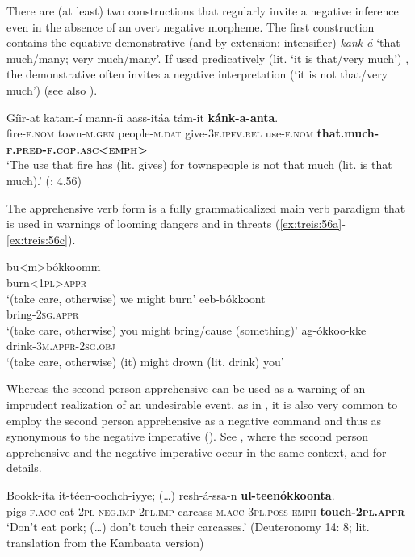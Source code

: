 \documentclass[output=paper,colorlinks,citecolor=brown,draftmode
]{langscibook}
\begin{document}
There are (at least) two constructions that regularly invite a negative inference even in the absence of an overt negative morpheme. The first construction contains the equative demonstrative (and by extension: intensifier) \textit{kank-á} ‘that much/\hspace{0pt}many; very much/many’. If used predicatively (lit. ‘it is that/very much’) , the demonstrative often invites a negative interpretation (‘it is not that/very much’) (see also \citealt[195]{Treis2019}).

\ea\label{ex:treis:55} 
\gll Gíir-at		katam-í			mann-íi			aass-itáa			tám-it	\textbf{kánk-a-anta}.\\
fire-\textsc{f.nom}	town-\textsc{m.gen}	people-\textsc{m.dat}	give-\textsc{3f.ipfv.rel}	use-\textsc{f.nom} \textbf{that.much-\textsc{f.pred-f.cop.asc<emph>}}\\
\glt ‘The use that fire has (lit. gives) for townspeople is not that much (lit. is that much).’ (\cite{KEB1989}{:} 4.56)
\z 

The apprehensive verb form \citep{TreisForthcoming} is a fully grammaticalized main verb paradigm that is used in warnings of looming dangers and in threats (\ref{ex:treis:56a}-\ref{ex:treis:56c}). 

\ea
\ea\label{ex:treis:56a}
\gll bu<m>bókkoomm \\
burn<\textsc{1pl>appr}\\
\glt ‘(take care, otherwise) we might burn’
\ex\label{ex:treis:56b}
\gll eeb-bókkoont \\
bring-\textsc{2sg.appr}\\
\glt ‘(take care, otherwise) you might bring/cause (something)’
\ex\label{ex:treis:56c}
\gll ag-ókkoo-kke\\
drink-\textsc{3m.appr-2sg.obj}\\
\glt ‘(take care, otherwise) (it) might drown (lit. drink) you’
\z
\z

Whereas the second person apprehensive can be used as a warning of an imprudent realization of an undesirable event, as in , it is also very common to employ the second person apprehensive as a negative command and thus as synonymous to the negative imperative (). See , where the second person apprehensive and the negative imperative occur in the same context, and \citet[§3.3]{TreisForthcoming} for details.

\ea\label{ex:treis:57}  
\gll Bookk-íta 	it-téen-oochch-iyye; (…) 	resh-á-ssa-n	\textbf{ul-teenókkoonta}.\\
pigs-\textsc{f.acc}	eat-\textsc{2pl-neg.imp-2pl.imp}	{} carcass-\textsc{m.acc-3pl.poss-emph} \textbf{touch-\textsc{2pl.appr}}\\
\glt ‘Don’t eat pork; (…) don’t touch their carcasses.’ (Deuteronomy 14: 8; lit. translation from the Kambaata version) \citep{BibleSociety2023}
\z 
\end{document}
